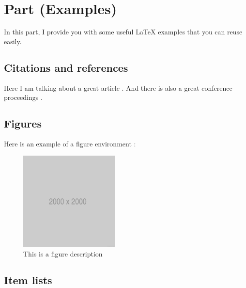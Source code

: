 \section{Part (Examples)}


In this part, I provide you with some useful \LaTeX{} examples that you can reuse easily.

\subsection{Citations and references}

Here I am talking about a great article \cite{ghosh_artificial_2021}. And there is also a great conference proceedings \cite{falkmer_viewpoints_2015}.

\subsection{Figures}

Here is an example of a figure environment : \cite{amoretti_utravel_2017}\cite{benssassi_wearable_2018}\cite{cecchini_mobility_2018}\cite{deka_co-principal_nodate}\cite{gong_building_2017}\cite{gong_building_2017-1}\cite{haas_experiences_nodate}\cite{kersten_developing_2021}\cite{mekbib_designing_2021}\cite{paiva_enabling_2021}\cite{silva_accessibility_2023}

\begin{center}
    \begin{figure}[ht!]
        \centering
        
        \includegraphics[width=5cm, keepaspectratio]{imports/2000.png}
        
        \caption{This is a figure description}
    \end{figure}
\end{center}

\subsection{Item lists}

